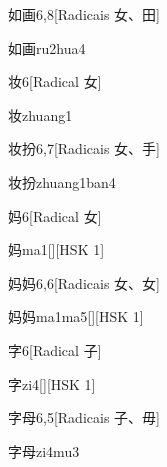 \begin{entry}{如画}{6,8}[Radicais ⼥、⽥]
  \begin{phonetics}{如画}{ru2hua4}
  \end{phonetics}
\end{entry}

\begin{entry}{妆}{6}[Radical ⼥]
  \begin{phonetics}{妆}{zhuang1}
  \end{phonetics}
\end{entry}

\begin{entry}{妆扮}{6,7}[Radicais ⼥、⼿]
  \begin{phonetics}{妆扮}{zhuang1ban4}
  \end{phonetics}
\end{entry}

\begin{entry}{妈}{6}[Radical ⼥]
  \begin{phonetics}{妈}{ma1}[][HSK 1]
  \end{phonetics}
\end{entry}

\begin{entry}{妈妈}{6,6}[Radicais ⼥、⼥]
  \begin{phonetics}{妈妈}{ma1ma5}[][HSK 1]
  \end{phonetics}
\end{entry}

\begin{entry}{字}{6}[Radical ⼦]
  \begin{phonetics}{字}{zi4}[][HSK 1]
  \end{phonetics}
\end{entry}

\begin{entry}{字母}{6,5}[Radicais ⼦、⽏]
  \begin{phonetics}{字母}{zi4mu3}
  \end{phonetics}
\end{entry}

